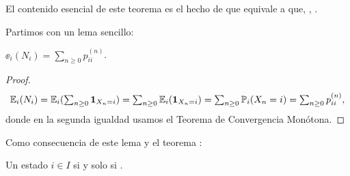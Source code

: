 
El contenido esencial de este teorema es el hecho de que  equivale a que, , .

Partimos con un lema sencillo:

\begin{lem}
$\ee_i(N_i)=\sum_{n\geq0}p_{ii}^{(n)}$.
\end{lem}

\begin{proof}
\[\textstyle\mathbb{E}_i(N_i)=\mathbb{E}_i(\sum_{n\geq0}\mathbf{1}_{X_n=i})=\sum_{n\geq0}\mathbb{E}_i(\mathbf{1}_{X_n=i})=\sum_{n\geq0}\mathbb{P}_i(X_n=i)=\sum_{n\geq0}p_{ii}^{(n)},\]
donde en la segunda igualdad usamos el Teorema de Convergencia Monótona.
\end{proof}

Como consecuencia de este lema y el teorema :

\begin{cor}
Un estado $i\in I$  si y solo si .
\end{cor}

